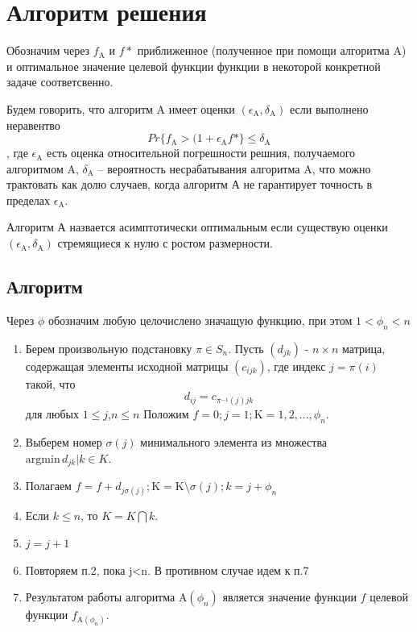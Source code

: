 \chapter{Алгоритм решения}
Обозначим через $f_{\mathrm{A}}$ и $f*$ приближенное (полученное при помощи алгоритма $\mathrm{A}$) 
и оптимальное значение целевой функции функции в некоторой конкретной задаче соответсвенно.

Будем говорить, что алгоритм  $\mathrm{A}$ имеет оценки $(\epsilon_{\mathrm{A}}, \delta_{\mathrm{A}})$
если выполнено неравентво 
\[
Pr \{ f_{\mathrm{A}} > (1+ \epsilon_{\mathrm{A}} f* \} \leq \delta_{\mathrm{A}}
\],
где $\epsilon_{\mathrm{A}}$ есть оценка относительной погрешности решния, получаемого алгоритмом ${\mathrm{A}}$,
$\delta_{\mathrm{A}}$ -- вероятность несрабатывания алгоритма ${\mathrm{A}}$, что можно трактовать как долю случаев, когда алгоритм А не гарантирует точность в пределах $\epsilon_{\mathrm{A}}$.

Алгоритм А назвается асимптотически оптимальным если существую оценки $(\epsilon_{\mathrm{A}}, \delta_{\mathrm{A}})$
стремящиеся к нулю с ростом размерности. 

\section{Алгоритм}
Через $\phi$ обозначим любую целочислено значащую функцию, при этом $1 < \phi_n < n$ 
\begin{enumerate}
\item Берем произвольную подстановку $\pi \in S_n$. Пусть $(d_{jk})$ - $n \times n$ 
матрица, содержащая элементы исходной матрицы $(c_{ijk})$, где индекс $j=\pi(i)$ такой, что
$$
d_{ij} = c_{\pi^{-1}(j)jk}
$$
для любых $1 \leq j$,$n \leq n$
Положим $f = 0 ; j =1 ; \mathrm{K}={1,2, \ldots , \phi_n}$. 
\item Выберем номер $\sigma(j)$ минимального элемента из множества $\mathrm{argmin} \, {d_{jk} | k \in K}$.
\item Полагаем $f = f + d_{j \sigma (j)} ; \mathrm{K} = \mathrm{K}  \setminus  {\sigma(j)} ; k=j+\phi_n$
\item Если $k \leq n $, то $K = K \bigcap {k}$.
\item $j = j + 1$
\item Повторяем п.2, пока j<n. В противном случае идем к п.7
\item Результатом работы алгоритма $\mathrm{A}(\phi_n)$ является значение функции $f$ целевой функции   
$f_{\mathrm{A}(\phi_n)}$. 
\end{enumerate}
